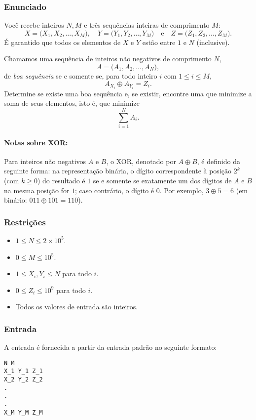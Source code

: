 \subsubsection*{Enunciado}
Você recebe inteiros \(N, M\) e três sequências inteiras de comprimento \(M\): 
\[
X = \bigl(X_1, X_2, \ldots, X_M\bigr),\quad
Y = \bigl(Y_1, Y_2, \ldots, Y_M\bigr) \quad \text{e} \quad
Z = \bigl(Z_1, Z_2, \ldots, Z_M\bigr).
\]
É garantido que todos os elementos de \(X\) e \(Y\) estão entre \(1\) e \(N\) (inclusive).

Chamamos uma sequência de inteiros não negativos de comprimento \(N\),
\[
A = \bigl(A_1, A_2, \ldots, A_N\bigr),
\]
de \emph{boa sequência} se e somente se, para todo inteiro \(i\) com \(1 \le i \le M\), 
\[
A_{X_i} \oplus A_{Y_i} = Z_i.
\]
Determine se existe uma boa sequência e, se existir, encontre uma que minimize a soma de seus elementos, isto é, que minimize
\[
\sum_{i=1}^{N} A_i.
\]

\paragraph{Notas sobre XOR:} Para inteiros não negativos \(A\) e \(B\), o XOR, denotado por \(A \oplus B\), é definido da seguinte forma: na representação binária, o dígito correspondente à posição \(2^k\) (com \(k \ge 0\)) do resultado é \(1\) se e somente se exatamente um dos dígitos de \(A\) e \(B\) na mesma posição for \(1\); caso contrário, o dígito é \(0\). Por exemplo, \(3 \oplus 5 = 6\) (em binário: \(011 \oplus 101 = 110\)).

\subsubsection*{Restrições}
\begin{itemize}
    \item \(1 \le N \le 2\times 10^5\).
    \item \(0 \le M \le 10^5\).
    \item \(1 \le X_i, Y_i \le N\) para todo \(i\).
    \item \(0 \le Z_i \le 10^9\) para todo \(i\).
    \item Todos os valores de entrada são inteiros.
\end{itemize}

\subsubsection*{Entrada}
A entrada é fornecida a partir da entrada padrão no seguinte formato:
\begin{verbatim}
N M
X_1 Y_1 Z_1
X_2 Y_2 Z_2
.
.
.
X_M Y_M Z_M
\end{verbatim}

